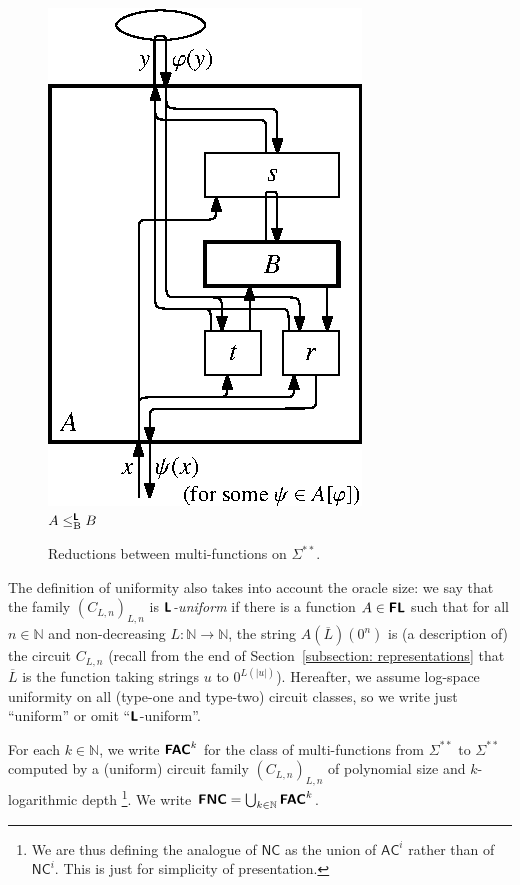 \documentclass[envcountsect,envcountsame,orivec,oribibl]{llncs}
\newcommand{\N}{\mathbb N}
\newcommand{\classonefont}[1]{\mathsf{#1}}
\newcommand{\classNC}{\classonefont{NC}}
\newcommand{\classAC}{\classonefont{AC}}
\newcommand{\classtwofont}[1]{\text{\bfseries \sffamily \upshape #1}}
\newcommand{\classLtwo}{\classtwofont{L}}
\newcommand{\classFLtwo}{\classtwofont{FL}}
\newcommand{\classFNCtwo}{\classtwofont{FNC}}
\newcommand{\classFACtwo}{\classtwofont{FAC}}
\newcommand{\redB}{\leq _{\mathrm B}}
\newcommand{\redLB}{\redB ^{\classLtwo}}
\newcommand{\LM}{\varSigma ^{**}}
\begin{document}
\begin{figure}
\begin{center}
\hfill
\parbox[t]{150pt}{\centering\includegraphics[scale=0.9]{./redtwoBCEIP.eps}\\[3pt]$A \redLB B$}
\hfill\mbox{}
\caption{Reductions between multi-functions on $\LM$.}
\label{figure: intermediate many-one reduction}
\end{center}
\end{figure}

The definition of uniformity 
also takes into account the oracle size: 
we say that the family $(C_{L,n})_{L,n}$ is 
\emph{$\classLtwo$-uniform} if 
there is a function $A \in \classFLtwo$ such that 
for all $n \in \N$ and non-decreasing $L \colon \N \to \N$, 
the string $A (\overline L) (0^n)$ is (a description of) the circuit $C_{L,n}$ 
(recall from the end of Section~\ref{subsection: representations} 
that $\overline L$ is the function taking strings $u$ to $0 ^{L (\lvert u \rvert)}$). 
Hereafter, we assume log-space uniformity on all (type-one and type-two) 
circuit classes, so we write just ``uniform'' or omit ``$\classLtwo$-uniform''.

\begin{definition}
 For each $k \in \N$, 
 we write $\classFACtwo^k$ for the class of 
 multi-functions from $\LM$ to $\LM$ computed by
 a (uniform) circuit family $(C_{L,n})_{L,n}$ 
of polynomial size and $k$-logarithmic depth%
\footnote{We are thus defining the analogue of $\classNC$ as the union of 
$\classAC^i$ rather than of $\classNC^i$.  This is just for simplicity of presentation.}. 
 We write $\classFNCtwo = \bigcup_{k \in \N} \classFACtwo^k$.
\end{definition}
\end{document}
